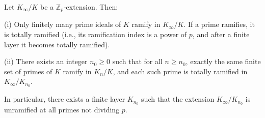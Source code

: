 Let $K_\infty / K$ be a $\mathbb{Z}_p$-extension. Then:

(i) Only finitely many prime ideals of $K$ ramify in $K_\infty / K$. If a prime ramifies, it is totally ramified (i.e., its ramification index is a power of $p$, and after a finite layer it becomes totally ramified).

(ii) There exists an integer $n_0 \geq 0$ such that for all $n \geq n_0$, exactly the same finite set of primes of $K$ ramify in $K_n/K$, and each such prime is totally ramified in $K_\infty / K_{n_0}$.

In particular, there exists a finite layer $K_{n_0}$ such that the extension $K_\infty / K_{n_0}$ is unramified at all primes not dividing $p$.
